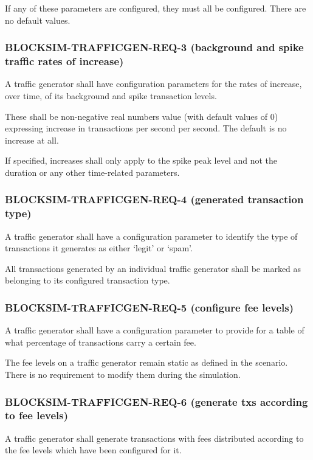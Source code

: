 \documentclass{scrreprt}
\begin{document}
If any of these parameters are configured, they must all be configured.
There are no default values.


\subsubsection{BLOCKSIM-TRAFFICGEN-REQ-3 (background and spike traffic rates of increase)}

A traffic generator shall have configuration parameters for the rates
of increase, over time, of its background and spike transaction levels.

These shall be non-negative real numbers value (with default values of 0)
expressing increase in transactions per second per second. The default
is no increase at all.

If specified, increases shall only apply to the spike peak level and not the
duration or any other time-related parameters.


\subsubsection{BLOCKSIM-TRAFFICGEN-REQ-4 (generated transaction type)}

A traffic generator shall have a configuration parameter to
identify the type of transactions it generates as either `legit' or `spam'.

All transactions generated by an individual traffic generator shall
be marked as belonging to its configured transaction type.


\subsubsection{BLOCKSIM-TRAFFICGEN-REQ-5 (configure fee levels)}

A traffic generator shall have a configuration parameter to
provide for a table of what percentage of transactions carry a certain fee.

The fee levels on a traffic generator remain static as defined in the scenario.
There is no requirement to modify them during the simulation.


\subsubsection{BLOCKSIM-TRAFFICGEN-REQ-6 (generate txs according to fee levels)}

A traffic generator shall generate transactions with fees distributed
according to the fee levels which have been configured for it.
\end{document}

